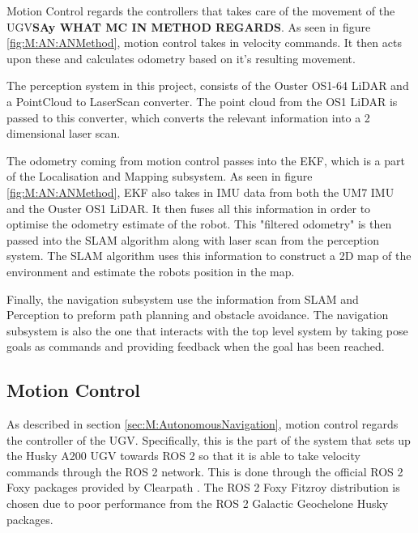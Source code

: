 Motion Control regards the controllers that takes care of the movement of the UGV\textbf{SAy WHAT MC IN METHOD REGARDS}. As seen in figure \ref{fig:M:AN:ANMethod}, motion control takes in velocity commands. It then acts upon these and calculates odometry based on it's resulting movement.

The perception system in this project, consists of the Ouster OS1-64 LiDAR and a PointCloud to LaserScan converter. The point cloud from the OS1 LiDAR is passed to this converter, which converts the relevant information into a 2 dimensional laser scan.

The odometry coming from motion control passes into the EKF, which is a part of the Localisation and Mapping subsystem. As seen in figure \ref{fig:M:AN:ANMethod}, EKF also takes in IMU data from both the UM7 IMU and the Ouster OS1 LiDAR. It then fuses all this information in order to optimise the odometry estimate of the robot. This "filtered odometry" is then passed into the SLAM algorithm along with laser scan from the perception system. The SLAM algorithm uses this information to construct a 2D map of the environment and estimate the robots position in the map. 

Finally, the navigation subsystem use the information from SLAM and Perception to preform path planning and obstacle avoidance. The navigation subsystem is also the one that interacts with the top level system by taking pose goals as commands and providing feedback when the goal has been reached.

\subsection{Motion Control}\label{sec:M:AN:MotionControl}
As described in section \ref{sec:M:AutonomousNavigation}, motion control regards the controller of the UGV. Specifically, this is the part of the system that sets up the Husky A200 UGV towards ROS 2 so that it is able to take velocity commands through the ROS 2 network. This is done through the official ROS 2 Foxy packages provided by Clearpath \cite{husky_repo}. The ROS 2 Foxy Fitzroy distribution is chosen due to poor performance from the ROS 2 Galactic Geochelone Husky packages.


